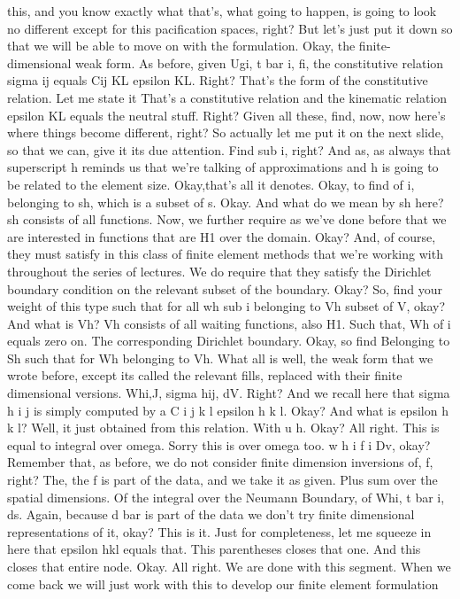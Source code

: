 \documentclass[10pt]{article}
\begin{document}
this, and you know exactly what that's, what going to happen, is going to look no different except for this pacification spaces, right? But let's just put it down so that we will be able to move on with the formulation. Okay, the finite-dimensional weak form. As before, given Ugi, t bar i, fi, the constitutive relation sigma ij equals Cij KL epsilon KL. Right? That's the form of the constitutive relation. Let me state it That's a constitutive relation and the kinematic relation epsilon KL equals the neutral stuff. Right? Given all these, find, now, now here's where things become different, right? So actually let me put it on the next slide, so that we can, give it its due attention. Find sub i, right? And as, as always that superscript h reminds us that we're talking of approximations and h is going to be related to the element size. Okay,that's all it denotes. Okay, to find of i, belonging to sh, which is a subset of s. Okay. And what do we mean by sh here? sh consists of all functions. Now, we further require as we've done before that we are interested in functions that are H1 over the domain. Okay? And, of course, they must satisfy in this class of finite element methods that we're working with throughout the series of lectures. We do require that they satisfy the Dirichlet boundary condition on the relevant subset of the boundary. Okay? So, find your weight of this type such that for all wh sub i belonging to Vh subset of V, okay? And what is Vh? Vh consists of all waiting functions, also H1. Such that, Wh of i equals zero on. The corresponding Dirichlet boundary. Okay, so find Belonging to Sh such that for Wh belonging to Vh. What all is well, the weak form that we wrote before, except its called the relevant fills, replaced with their finite dimensional versions. Whi,J, sigma hij, dV. Right? And we recall here that sigma h i j is simply computed by a C i j k l epsilon h k l. Okay? And what is epsilon h k l? Well, it just obtained from this relation. With u h. Okay? All right. This is equal to integral over omega. Sorry this is over omega too. w h i f i Dv, okay? Remember that, as before, we do not consider finite dimension inversions of, f, right? The, the f is part of the data, and we take it as given. Plus sum over the spatial dimensions. Of the integral over the Neumann Boundary, of Whi, t bar i, ds. Again, because d bar is part of the data we don't try finite dimensional representations of it, okay? This is it. Just for completeness, let me squeeze in here that epsilon hkl equals that. This parentheses closes that one. And this closes that entire node. Okay. All right. We are done with this segment. When we come back we will just work with this to develop our finite element formulation
\end{document}
